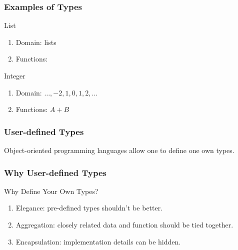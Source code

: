 \begin{frame}[fragile] 
\frametitle{Examples of Types}

\begin{block}{List}
\begin{enumerate}
\item Domain: lists
\item Functions: 
\end{enumerate}
\end{block}

\pause
\begin{block}{Integer}
\begin{enumerate}
\item Domain: $\dots,-2, 1, 0, 1, 2, \dots$
\item Functions: $A + B$
\end{enumerate}
\end{block}
\end{frame}

\begin{frame}[fragile] 
\frametitle{User-defined Types}

Object-oriented programming languages allow one to define one own types.

\end{frame}

\begin{frame}[fragile] 
\frametitle{Why User-defined Types}

\begin{block}{Why Define Your Own Types?}
\begin{enumerate}
\item Elegance: pre-defined types shouldn't be better.
\item Aggregation: closely related data and function should be tied together.
\item Encapsulation: implementation details can be hidden.
\end{enumerate}
\end{block}

\end{frame}

